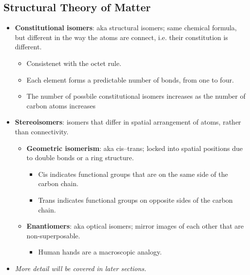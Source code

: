 \documentclass[12pt,a4paper]{article}
\begin{document}
\subsection{Structural Theory of Matter}
\begin{itemize}
    \item \textbf{Constitutional isomers}: aka structural isomers; same {\color{o-Sun}chemical formula}, but different in the way the {\color{o-Sun}atoms are connect}, i.e. their constitution is different.
        \begin{itemize}
            \item Consistenet with the octet rule.
            \item Each element forms a predictable number of bonds, from one to four.
            \item The number of {\color{pos}possbile constitutional isomers increases} as the number of {\color{pos}carbon atoms increases}
        \end{itemize}
    \item \textbf{Stereoisomers}: isomers that differ in {\color{o-Sun}spatial arrangement} of atoms, rather than connectivity.
        \begin{itemize}
            \item \textbf{Geometric isomerism}: aka cis--trans; {\color{o-Sun}locked into spatial positions} due to double bonds or a ring structure.
                \begin{itemize}
                    \item Cis indicates functional groups that are on the same side of the carbon chain.
                    \item Trans indicates functional groups on opposite sides of the carbon chain.
                \end{itemize}
            \item \textbf{Enantiomers}: aka optical isomers; mirror images of each other that are non-superposable.
                \begin{itemize}
                    \item Human hands are a macroscopic analogy.
                \end{itemize}
        \end{itemize}
    \item \textit{More detail will be covered in later sections.}
\end{itemize}
\end{document}
